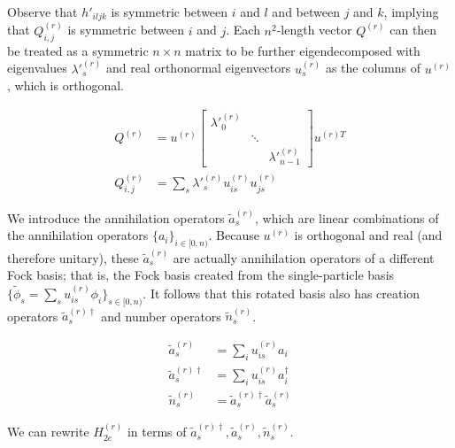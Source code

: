 Observe that $h'_{iljk}$ is symmetric between $i$ and $l$ and between $j$ and $k$, implying that $Q^{(r)}_{i, j}$ is symmetric between $i$ and $j$. Each $n^2$-length vector $Q^{(r)}$ can then be treated as a symmetric $n \times n$ matrix to be further eigendecomposed with eigenvalues $\lambda'^{(r)}_s$ and real orthonormal eigenvectors $u^{(r)}_s$ as the columns of $u^{(r)}$, which is orthogonal.

\begin{equation}
    \begin{split}
        Q^{(r)} &= u^{(r)}\begin{bmatrix}
            \lambda'^{(r)}_0 & & \\ & \ddots & \\ & & \lambda'^{(r)}_{n - 1}
          \end{bmatrix}u^{(r)T} \\
        Q^{(r)}_{i, j} &= \sum_s \lambda'^{(r)}_s u^{(r)}_{is}u^{(r)}_{js}
    \end{split}
\end{equation}

We introduce the annihilation operators $\tilde{a}^{(r)}_s$, which are linear combinations of the annihilation operators $\{a_i\}_{i \in [0, n)}$. Because $u^{(r)}$ is orthogonal and real (and therefore unitary), these $\tilde{a}^{(r)}_s$ are actually annihilation operators of a different Fock basis; that is, the Fock basis created from the single-particle basis $\{\tilde{\phi}_s = \sum_s u^{(r)}_{is} \phi_i\}_{s \in [0, n)}$. It follows that this rotated basis also has creation operators $\tilde{a}^{(r)\dag}_s$ and number operators $\tilde{n}^{(r)}_s$.

\begin{equation}
    \begin{split}
        \tilde{a}^{(r)}_s &= \sum_iu^{(r)}_{is}a_i \\
        \tilde{a}^{(r)\dag}_s &= \sum_iu^{(r)}_{is}a^\dag_i \\
        \tilde{n}^{(r)}_s &= \tilde{a}^{(r)\dag}_s\tilde{a}^{(r)}_s
    \end{split}
    \label{eq: basis}
\end{equation}

We can rewrite $H_{2e}^{(r)}$ in terms of $\tilde{a}^{(r)\dag}_s, \tilde{a}^{(r)}_s, \tilde{n}^{(r)}_s$.


